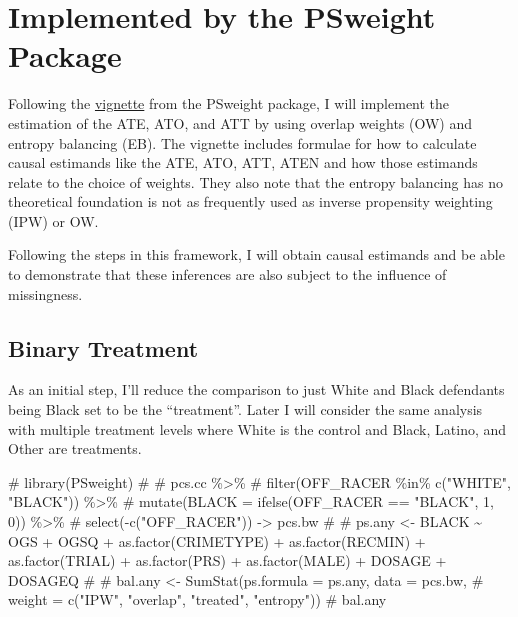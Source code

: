 \documentclass[
  letterpaper,
  DIV=11,
  numbers=noendperiod]{scrartcl}
\newenvironment{Shaded}{\begin{snugshade}}{\end{snugshade}}
\newcommand{\CommentTok}[1]{\textcolor[rgb]{0.37,0.37,0.37}{#1}}
\begin{document}
\hypertarget{implemented-by-the-psweight-package}{%
\section{Implemented by the PSweight
Package}\label{implemented-by-the-psweight-package}}

Following the
\href{https://cran.r-project.org/web/packages/PSweight/vignettes/vignette.pdf}{vignette}
from the PSweight package, I will implement the estimation of the ATE,
ATO, and ATT by using overlap weights (OW) and entropy balancing (EB).
The vignette includes formulae for how to calculate causal estimands
like the ATE, ATO, ATT, ATEN and how those estimands relate to the
choice of weights. They also note that the entropy balancing has no
theoretical foundation is not as frequently used as inverse propensity
weighting (IPW) or OW.

Following the steps in this framework, I will obtain causal estimands
and be able to demonstrate that these inferences are also subject to the
influence of missingness.

\hypertarget{binary-treatment}{%
\subsection{Binary Treatment}\label{binary-treatment}}

As an initial step, I'll reduce the comparison to just White and Black
defendants being Black set to be the ``treatment''. Later I will
consider the same analysis with multiple treatment levels where White is
the control and Black, Latino, and Other are treatments.

\begin{Shaded}
\begin{Highlighting}[]
\CommentTok{\# library(PSweight)}
\CommentTok{\# }
\CommentTok{\# pcs.cc \%\textgreater{}\% }
\CommentTok{\#     filter(OFF\_RACER \%in\% c("WHITE", "BLACK")) \%\textgreater{}\% }
\CommentTok{\#     mutate(BLACK = ifelse(OFF\_RACER == "BLACK", 1, 0)) \%\textgreater{}\% }
\CommentTok{\#     select({-}c("OFF\_RACER")) {-}\textgreater{} pcs.bw}
\CommentTok{\# }
\CommentTok{\# ps.any \textless{}{-} BLACK \textasciitilde{} OGS + OGSQ + as.factor(CRIMETYPE) + as.factor(RECMIN) + as.factor(TRIAL) + as.factor(PRS) + as.factor(MALE) + DOSAGE + DOSAGEQ}
\CommentTok{\# }
\CommentTok{\# bal.any \textless{}{-} SumStat(ps.formula = ps.any, data = pcs.bw,}
\CommentTok{\#                    weight = c("IPW", "overlap", "treated", "entropy"))}
\CommentTok{\# bal.any}
\end{Highlighting}
\end{Shaded}
\end{document}
